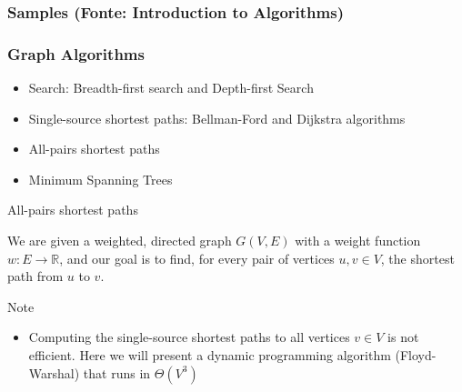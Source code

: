 \begin{frame}
\frametitle{Samples (Fonte: Introduction to Algorithms)}

\end{frame}


\begin{frame}
  \frametitle{Graph Algorithms}

  \begin{itemize}
   \item Search: Breadth-first search and Depth-first Search
   \item Single-source shortest paths: Bellman-Ford and Dijkstra algorithms
   \item {\color{blue}All-pairs shortest paths}  
   \item {\color{blue}Minimum Spanning Trees}
  \end{itemize}
\end{frame}


\begin{frame}{All-pairs shortest paths}

  We are given a weighted, directed graph $G(V, E)$ with a
  weight function $w : E \rightarrow \mathbb{R}$, and our goal
  is to find, for {\color{blue}every} pair of vertices $u, v \in V$,
  the shortest path from $u$ to $v$.

  \pause

  \begin{block}{Note}
  \begin{itemize}
    \item Computing the single-source shortest paths to all
      vertices $v \in V$ is not efficient. \pause Here we will present a
      dynamic programming algorithm (Floyd-Warshal) that runs in $\Theta(V^3)$ 
  \end{itemize}
  \end{block}

\end{frame}


